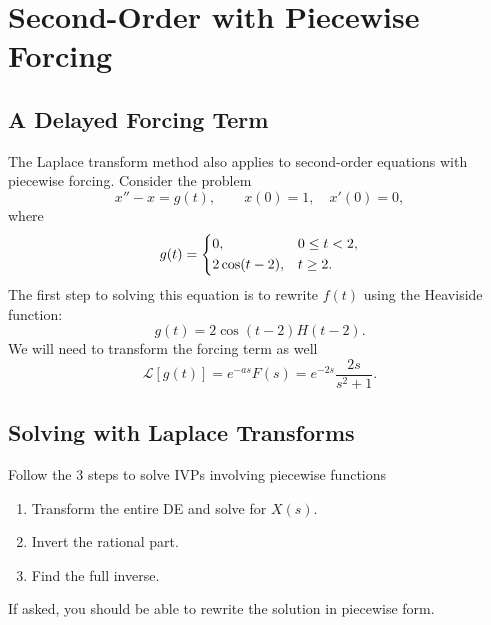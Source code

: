 \documentclass[10pt,letterpaper]{article}
\begin{document}
\section{Second-Order with Piecewise Forcing}

\subsection{A Delayed Forcing Term}
The Laplace transform method also applies to second-order
equations with piecewise forcing. Consider the problem
\[
x''-x=g(t),
\qquad x(0)=1,\quad x'(0)=0,
\]
where
\[
g(t)=
\begin{dcases}
0, & 0\le t<2,\\
2\cos(t-2), & t\ge2.
\end{dcases}
\]
The first step to solving this equation is to rewrite $f(t)$ using the Heaviside function:
\[
g(t)=2\cos(t-2)H(t-2).
\]
We will need to transform the forcing term as well
\[
\mathcal L[g(t)]
=e^{-as}F(s)
=e^{-2s}\frac{2s}{s^2+1}.
\]


\subsection{Solving with Laplace Transforms}
Follow the 3 steps to solve IVPs involving piecewise functions
\begin{enumerate}
    \item Transform the entire DE and solve for $X(s)$.
    \item Invert the rational part. 
    \item Find the full inverse.
\end{enumerate}
If asked, you should be able to rewrite the solution in piecewise form.
\end{document}
